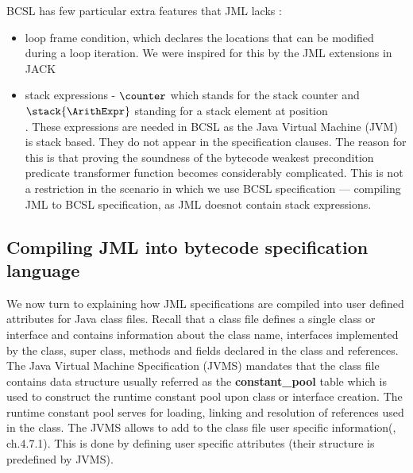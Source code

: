 BCSL has few particular extra features that JML lacks :
\begin{itemize}
   \item loop frame condition, which declares the locations
that can be modified during a loop iteration. We were inspired for this by the JML extensions in JACK ~\cite{BRL-JACK}

   \item stack expressions - $\counter$ which stands for the stack counter and \\
 $\stack{\ArithExpr}$ standing for a stack element at position \\
\ArithExpr. These expressions are needed in BCSL as the Java Virtual Machine (JVM) is
stack based.  They do not appear in the specification clauses. The reason for this is that proving the soundness
 of the bytecode weakest precondition predicate transformer function becomes considerably complicated.
 This is not a restriction in the scenario in which we use BCSL specification --- compiling JML
to BCSL specification, as JML doesnot contain stack expressions.


\end{itemize}



\subsection{Compiling JML into bytecode specification language}\label{comJML}


We now turn to explaining how JML specifications are compiled into user defined attributes for Java class files. Recall that a class file defines
a single class or interface and contains information about  the class name, interfaces implemented by the class, super class, methods and fields declared in the class and references. The Java Virtual Machine Specification (JVMS) \cite{VMSpec} mandates that the class file contains data structure usually referred as the \textbf{constant\_pool} table which is used to construct the runtime constant pool upon class or interface creation. The runtime constant pool serves for loading, linking and resolution of references used in the class. The JVMS allows to add to the class file user specific information(\cite{VMSpec}, ch.4.7.1). This is done by defining user specific attributes  (their structure is predefined by JVMS).

